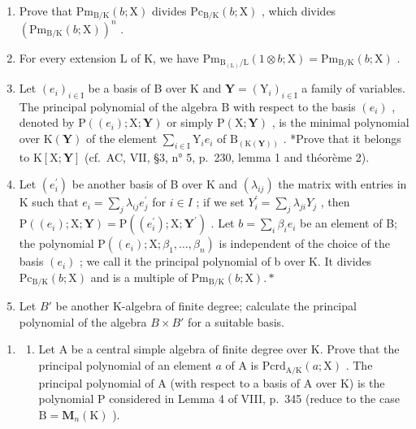 \begin{enumerate}
\def\labelenumi{\alph{enumi})}
\item
  Prove that \(\mathrm{Pm}_{\mathrm{B / K}}(b;\mathrm{X})\) divides \(\mathrm{Pc}_{\mathrm{B / K}}(b;\mathrm{X})\) , which divides \((\mathrm{Pm}_{\mathrm{B / K}}(b;\mathrm{X}))^n\) .
\item
  For every extension L of K, we have \(\mathrm{Pm}_{\mathrm{B}_{(\mathrm{L})}/\mathrm{L}}(1 \otimes b; \mathrm{X}) = \mathrm{Pm}_{\mathrm{B}/\mathrm{K}}(b; \mathrm{X})\) .
\item
  Let \((e_i)_{i\in \mathrm{I}}\) be a basis of B over K and \(\mathbf{Y} = (\mathrm{Y}_i)_{i\in \mathrm{I}}\) a family of variables. The principal polynomial of the algebra B with respect to the basis \((e_i)\) , denoted by \(\mathrm{P}((e_i);\mathrm{X};\mathbf{Y})\) or simply \(\mathrm{P}(\mathrm{X};\mathbf{Y})\) , is the minimal polynomial over \(\mathrm{K}(\mathbf{Y})\) of the element \(\sum_{i\in \mathrm{I}}\mathrm{Y}_i e_i\) of \(\mathrm{B}_{(\mathrm{K}(\mathbf{Y}))}\) . *Prove that it belongs to \(\mathrm{K}[\mathrm{X};\mathbf{Y}]\) (cf.~AC, VII, §3, n° 5, p.~230, lemma 1 and théorème 2).
\item
  Let \((e_{i}^{\prime})\) be another basis of B over K and \((\lambda_{ij})\) the matrix with entries in K such that \(e_{i} = \sum_{j} \lambda_{ij} e_{j}^{\prime}\) for \(i \in I\) ; if we set \(Y_{i}^{\prime} = \sum_{j} \lambda_{ji} Y_{j}\) , then \(\mathrm{P}((e_{i}); \mathrm{X}; \mathbf{Y}) = \mathrm{P}((e_{i}^{\prime}); \mathrm{X}; \mathbf{Y}^{\prime})\) . Let \(b = \sum_{i} \beta_{i} e_{i}\) be an element of B; the polynomial \(\mathrm{P}((e_{i}); \mathrm{X}; \beta_{1}, \ldots, \beta_{n})\) is independent of the choice of the basis \((e_{i})\) ; we call it the principal polynomial of b over K. It divides \(\mathrm{Pc}_{\mathrm{B/K}}(b; \mathrm{X})\) and is a multiple of \(\mathrm{Pm}_{\mathrm{B/K}}(b; \mathrm{X}).*\)
\item
  Let \(B'\) be another K-algebra of finite degree; calculate the principal polynomial of the algebra \(B \times B'\) for a suitable basis.
\end{enumerate}

\begin{enumerate}
\def\labelenumi{\arabic{enumi})}
\setcounter{enumi}{2}
\tightlist
\item
  \begin{enumerate}
  \def\labelenumii{\alph{enumii})}
  \tightlist
  \item
    Let A be a central simple algebra of finite degree over K. Prove that the principal polynomial of an element \(a\) of A is \(\mathrm{Pcrd}_{\mathrm{A} / \mathrm{K}}(a; \mathrm{X})\) . The principal polynomial of A (with respect to a basis of A over K) is the polynomial P considered in Lemma 4 of VIII, p.~345 (reduce to the case \(\mathrm{B} = \mathbf{M}_n(\mathrm{K})\) ).
  \end{enumerate}
\end{enumerate}

